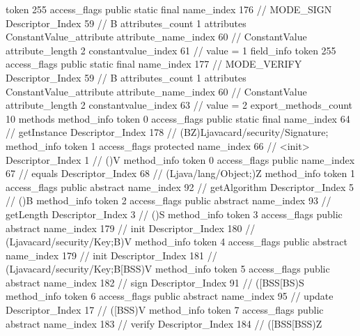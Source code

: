 {{{{{				token	255
				access_flags	public static final
				name_index	176		// MODE_SIGN
				Descriptor_Index	59		// B
				attributes_count	1
				attributes {
				ConstantValue_attribute {
					attribute_name_index	60		// ConstantValue
					attribute_length	2
					constantvalue_index	61		// value = 1
				}
				}
			}
			field_info {
				token	255
				access_flags	public static final
				name_index	177		// MODE_VERIFY
				Descriptor_Index	59		// B
				attributes_count	1
				attributes {
				ConstantValue_attribute {
					attribute_name_index	60		// ConstantValue
					attribute_length	2
					constantvalue_index	63		// value = 2
				}
				}
			}
			}
			export_methods_count	10
			methods {
				method_info {
					token	0
					access_flags	public static final
					name_index	64		// getInstance
					Descriptor_Index	178		// (BZ)Ljavacard/security/Signature;
				}
				method_info {
					token	1
					access_flags	protected
					name_index	66		// <init>
					Descriptor_Index	1		// ()V
				}
				method_info {
					token	0
					access_flags	public
					name_index	67		// equals
					Descriptor_Index	68		// (Ljava/lang/Object;)Z
				}
				method_info {
					token	1
					access_flags	public abstract
					name_index	92		// getAlgorithm
					Descriptor_Index	5		// ()B
				}
				method_info {
					token	2
					access_flags	public abstract
					name_index	93		// getLength
					Descriptor_Index	3		// ()S
				}
				method_info {
					token	3
					access_flags	public abstract
					name_index	179		// init
					Descriptor_Index	180		// (Ljavacard/security/Key;B)V
				}
				method_info {
					token	4
					access_flags	public abstract
					name_index	179		// init
					Descriptor_Index	181		// (Ljavacard/security/Key;B[BSS)V
				}
				method_info {
					token	5
					access_flags	public abstract
					name_index	182		// sign
					Descriptor_Index	91		// ([BSS[BS)S
				}
				method_info {
					token	6
					access_flags	public abstract
					name_index	95		// update
					Descriptor_Index	17		// ([BSS)V
				}
				method_info {
					token	7
					access_flags	public abstract
					name_index	183		// verify
					Descriptor_Index	184		// ([BSS[BSS)Z
				}
			}
		}
	}
}
